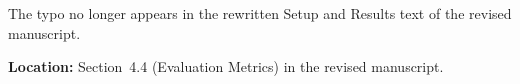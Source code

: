 \documentclass[a4paper,11pt]{article}
\newcommand{\response}[1]{%
    \begin{myresponse}
        #1
    \end{myresponse}
    \vspace{5mm}
}
\begin{document}
\response{
The typo no longer appears in the rewritten Setup and Results text of the revised manuscript.

\textbf{Location:} Section~4.4 (Evaluation Metrics) in the revised manuscript.
}
%
%
%
%
\end{document}
